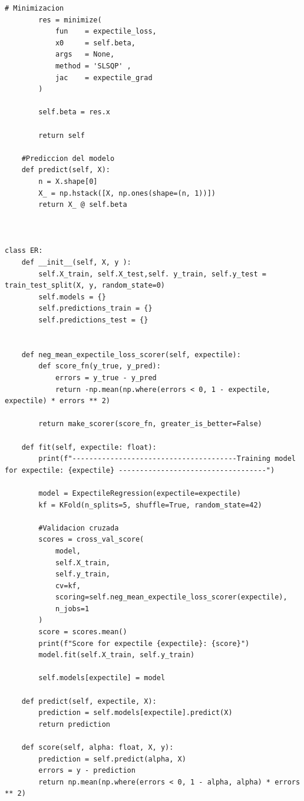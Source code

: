 \documentclass[11pt]{book}
\theoremstyle{plain} %
\theoremstyle{definition} %
\begin{document}
\begin{lstlisting}[style=pythonstyle, caption=expectileregression.py]
        # Minimizacion
        res = minimize(
            fun    = expectile_loss,
            x0     = self.beta,
            args   = None,
            method = 'SLSQP' ,
            jac    = expectile_grad
        )
        
        self.beta = res.x
        
        return self
    
    #Prediccion del modelo
    def predict(self, X):
        n = X.shape[0]
        X_ = np.hstack([X, np.ones(shape=(n, 1))])
        return X_ @ self.beta
    


class ER:
    def __init__(self, X, y ):
        self.X_train, self.X_test,self. y_train, self.y_test = train_test_split(X, y, random_state=0)
        self.models = {}
        self.predictions_train = {}
        self.predictions_test = {}

    
    def neg_mean_expectile_loss_scorer(self, expectile):
        def score_fn(y_true, y_pred):
            errors = y_true - y_pred
            return -np.mean(np.where(errors < 0, 1 - expectile, expectile) * errors ** 2)
        
        return make_scorer(score_fn, greater_is_better=False)

    def fit(self, expectile: float):
        print(f"---------------------------------------Training model for expectile: {expectile} -----------------------------------")

        model = ExpectileRegression(expectile=expectile)
        kf = KFold(n_splits=5, shuffle=True, random_state=42)

        #Validacion cruzada
        scores = cross_val_score(
            model,
            self.X_train,
            self.y_train,
            cv=kf,
            scoring=self.neg_mean_expectile_loss_scorer(expectile),
            n_jobs=1
        )
        score = scores.mean()
        print(f"Score for expectile {expectile}: {score}")
        model.fit(self.X_train, self.y_train)

        self.models[expectile] = model

    def predict(self, expectile, X):
        prediction = self.models[expectile].predict(X)
        return prediction

    def score(self, alpha: float, X, y):
        prediction = self.predict(alpha, X)
        errors = y - prediction
        return np.mean(np.where(errors < 0, 1 - alpha, alpha) * errors ** 2)
    
 \end{lstlisting}
\end{document}
